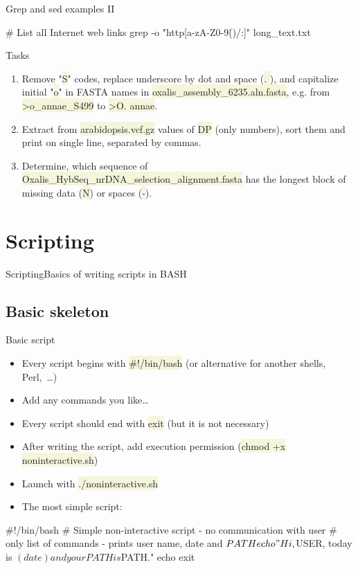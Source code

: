 \documentclass[compress, ucs, xelatex, 11pt, xcolor=svgnames, aspectratio=169,
	hyperref={
		bookmarks=true,
		unicode=true,
		colorlinks=true,
		pdftitle={Linux, command line and MetaCentrum},
		plainpages=false,
		pdfauthor={Vojtech Zeisek},
		pdfsubject={Course about use of Linux command line, writing shell scripts and using MetaCentrum of CESNET},
		pdfcreator={XeLaTeX},
		pdfkeywords={Linux, GNU, BASH, shell, command line, MetaCentrum},
		linkcolor=DarkRed, %
		anchorcolor=DarkBlue, %
		citecolor=Indigo, %
		filecolor=NavyBlue, %
		menucolor=DarkMagenta, %
		urlcolor=DarkBlue, %
		pdftex},
	url={hyphens, lowtilde} %
	]{beamer}
\renewcommand{\texttt}[1]{\colorbox{Beige}{{\ttfamily #1}}}
\begin{document}
\begin{frame}[fragile]{Grep and sed examples II}
	\begin{bashcode}
    # List all Internet web links
    grep -o "http[a-zA-Z0-9\.()/:\-]\+" long_text.txt
	\end{bashcode}
		\begin{block}{Tasks}
			\begin{enumerate}
				\item Remove "\texttt{S}" codes, replace underscore by dot and space (\texttt{. }), and capitalize initial "\texttt{o}" in FASTA names in \texttt{oxalis\_assembly\_6235.aln.fasta}, e.g. from \texttt{>o\_annae\_S499} to \texttt{>O. annae}.
				\item Extract from \texttt{arabidopsis.vcf.gz} values of \texttt{DP} (only numbers), sort them and print on single line, separated by commas.
				\item Determine, which sequence of \texttt{Oxalis\_HybSeq\_nrDNA\_selection\_alignment.fasta} has the longest block of missing data (\texttt{N}) or spaces (\texttt{-}).
			\end{enumerate}
		\end{block}
	\end{frame}

\section{Scripting}

\begin{frame}{Scripting}{Basics of writing scripts in BASH}
	\tableofcontents[currentsection, sectionstyle=show/hide, hideothersubsections]
\end{frame}

\subsection{Basic skeleton}

\begin{frame}[fragile]{Basic script}
	\begin{itemize}
		\item Every script begins with \texttt{\#!/bin/bash} (or alternative for another shells, Perl,~\ldots)
		\item Add any commands you like\ldots
		\item Every script should end with \texttt{exit} (but it is not necessary)
		\item After writing the script, add execution permission (\texttt{chmod +x noninteractive.sh})
		\item Launch with \texttt{./noninteractive.sh}
		\item The most simple script:
	\end{itemize}
	\vfill
	\begin{bashcode}
    #!/bin/bash
    # Simple non-interactive script - no communication with user
    # only list of commands - prints user name, date and $PATH
    echo "Hi, $USER, today is $(date) and your PATH is $PATH."
    echo
    exit
	\end{bashcode}
\end{frame}
\end{document}
